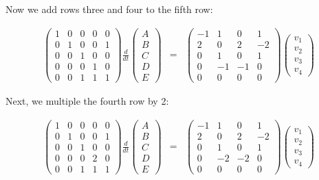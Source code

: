 \documentclass{article}
\begin{document}
Now we add rows three and four to the fifth row:

\begin{eqnarray*}
\begin{pmatrix} 1 & 0 & 0 & 0 & 0\\ 0 & 1 & 0 & 0 &1\\ 0 & 0 & 1 & 0 & 0\\ 0 & 0 & 0& 1 & 0\\ 0 & 0 & 1 & 1 & 1\end{pmatrix}
\frac{d}{dt} \begin{pmatrix} A\\ B \\ C\\ D\\ E \end{pmatrix} 
& = & \begin{pmatrix} -1 & 1 & 0 & 1\\
2 & 0 & 2 & -2\\
0 & 1 & 0 & 1\\
0 & -1 & -1 & 0\\
0 & 0 & 0 & 0
\end{pmatrix} \begin{pmatrix} v_1\\ v_2 \\ v_3 \\ v_4 \end{pmatrix}
\end{eqnarray*}

Next, we multiple the fourth row by 2:

\begin{eqnarray*}
\begin{pmatrix} 1 & 0 & 0 & 0 & 0\\ 0 & 1 & 0 & 0 &1\\ 0 & 0 & 1 & 0 & 0\\ 0 & 0 & 0& 2 & 0\\ 0 & 0 & 1 & 1 & 1\end{pmatrix}
\frac{d}{dt} \begin{pmatrix} A\\ B \\ C\\ D\\ E \end{pmatrix} 
& = & \begin{pmatrix} -1 & 1 & 0 & 1\\
2 & 0 & 2 & -2\\
0 & 1 & 0 & 1\\
0 & -2 & -2 & 0\\
0 & 0 & 0 & 0
\end{pmatrix} \begin{pmatrix} v_1\\ v_2 \\ v_3 \\ v_4 \end{pmatrix}
\end{eqnarray*}
\end{document}

